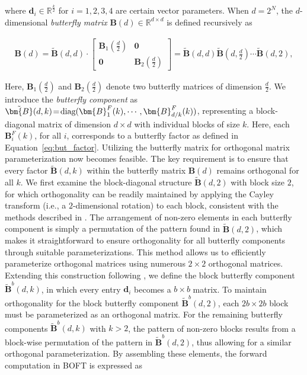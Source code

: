 where $\bm{d}_i\in\mathbb{R}^{\frac{k}{2}}$ for $i=1,2,3,4$ are certain vector parameters. When $d=2^N$, the $d$-dimensional \emph{butterfly matrix} $\bm{B}(d)\in\mathbb{R}^{d\times d}$ is defined recursively as

\begin{equation}
\begin{aligned}
    \bm{B}(d)=\tilde{\bm{B}}(d,d)\!\cdot\!\begin{bmatrix}
    \bm{B}_1(\frac{d}{2})\!\!\!\!\! & \bm{0} \\
    \bm{0}\!\!\!\!\! &\bm{B}_2(\frac{d}{2})
    \end{bmatrix}= \tilde{\bm{B}}(d,d)\tilde{\bm{B}}(d,\frac{d}{2})\cdots\tilde{\bm{B}}(d,2),
\end{aligned}
\end{equation}

Here, $\bm{B}_1(\frac{d}{2})$ and $\bm{B}_2(\frac{d}{2})$ denote two butterfly matrices of dimension $\frac{d}{2}$. We introduce the \emph{butterfly component} as $\thickmuskip=2mu \medmuskip=2mu \tilde{\bm{B}}(d,k)=\text{diag}(\bm{B}^F_1(k),\cdots,\bm{B}^F_{d/k}(k))$, representing a block-diagonal matrix of dimension $d\times d$ with individual blocks of size $k$. Here, each $\bm{B}^F_i(k)$, for all $i$, corresponds to a butterfly factor as defined in Equation~\ref{eq:but_factor}. Utilizing the butterfly matrix for orthogonal matrix parameterization now becomes feasible. The key requirement is to ensure that every factor $\tilde{\bm{B}}(d,k)$ within the butterfly matrix $\bm{B}(d)$ remains orthogonal for all $k$. We first examine the block-diagonal structure $\tilde{\bm{B}}(d,2)$ with block size $2$, for which orthogonality can be readily maintained by applying the Cayley transform (i.e., a $2$-dimensional rotation) to each block, consistent with the methods described in \cite{liu2021orthogonal,qiu2023controlling}. The arrangement of non-zero elements in each butterfly component is simply a permutation of the pattern found in $\tilde{\bm{B}}(d,2)$, which makes it straightforward to ensure orthogonality for all butterfly components through suitable parameterizations. This method allows us to efficiently parameterize orthogonal matrices using numerous $2\times 2$ orthogonal matrices. Extending this construction following \cite{chen2022pixelated}, we define the block butterfly component $\tilde{\bm{B}}^b(d,k)$, in which every entry $\bm{d}_i$ becomes a $b\times b$ matrix. To maintain orthogonality for the block butterfly component $\tilde{\bm{B}}^b(d,2)$, each $2b\times 2b$ block must be parameterized as an orthogonal matrix. For the remaining butterfly components $\tilde{\bm{B}}^b(d,k)$ with $k>2$, the pattern of non-zero blocks results from a block-wise permutation of the pattern in $\tilde{\bm{B}}^b(d,2)$, thus allowing for a similar orthogonal parameterization. By assembling these elements, the forward computation in BOFT is expressed as

